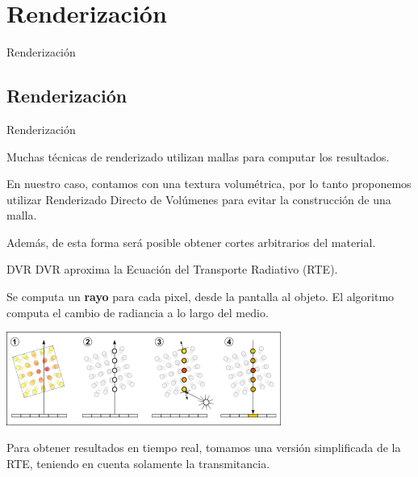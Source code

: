 \documentclass[spanish]{beamer}
\begin{document}
\section{Renderización}


\begin{frame}
\begin{block}{}
\begin{center}
\vspace{1cm}
\huge{Renderización}
\vspace{1cm}
\end{center}
\end{block}
\end{frame}


\subsection{Renderización}

\begin{frame}{Renderización}

Muchas técnicas de renderizado utilizan mallas para computar los resultados.

En nuestro caso, contamos con una textura volumétrica, por lo tanto proponemos utilizar Renderizado Directo de Volúmenes para evitar la construcción de una malla.

Además, de esta forma será posible obtener cortes arbitrarios del material.

\end{frame}

\begin{frame}{DVR}
DVR aproxima la Ecuación del Transporte Radiativo (RTE).

Se computa un \textbf{rayo} para cada pixel, desde la pantalla al objeto. El algoritmo computa el cambio de radiancia a lo largo del medio.


\centerline{\includegraphics[width=9cm]{../figures/dvr}}

Para obtener resultados en tiempo real, tomamos una versión simplificada de la RTE, teniendo en cuenta solamente la transmitancia.
\end{frame}
\end{document}
